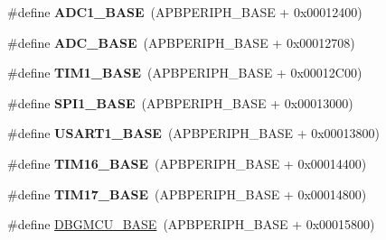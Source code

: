 \begin{DoxyCompactItemize}
\item 
\mbox{\label{group___peripheral__memory__map_ga695c9a2f892363a1c942405c8d351b91}} 
\#define {\bfseries A\+D\+C1\+\_\+\+B\+A\+SE}~(A\+P\+B\+P\+E\+R\+I\+P\+H\+\_\+\+B\+A\+SE + 0x00012400)
\item 
\mbox{\label{group___peripheral__memory__map_gad06cb9e5985bd216a376f26f22303cd6}} 
\#define {\bfseries A\+D\+C\+\_\+\+B\+A\+SE}~(A\+P\+B\+P\+E\+R\+I\+P\+H\+\_\+\+B\+A\+SE + 0x00012708)
\item 
\mbox{\label{group___peripheral__memory__map_gaf8aa324ca5011b8173ab16585ed7324a}} 
\#define {\bfseries T\+I\+M1\+\_\+\+B\+A\+SE}~(A\+P\+B\+P\+E\+R\+I\+P\+H\+\_\+\+B\+A\+SE + 0x00012\+C00)
\item 
\mbox{\label{group___peripheral__memory__map_ga50cd8b47929f18b05efbd0f41253bf8d}} 
\#define {\bfseries S\+P\+I1\+\_\+\+B\+A\+SE}~(A\+P\+B\+P\+E\+R\+I\+P\+H\+\_\+\+B\+A\+SE + 0x00013000)
\item 
\mbox{\label{group___peripheral__memory__map_ga86162ab3f740db9026c1320d46938b4d}} 
\#define {\bfseries U\+S\+A\+R\+T1\+\_\+\+B\+A\+SE}~(A\+P\+B\+P\+E\+R\+I\+P\+H\+\_\+\+B\+A\+SE + 0x00013800)
\item 
\mbox{\label{group___peripheral__memory__map_ga16c97093a531d763b0794c3e6d09e1bf}} 
\#define {\bfseries T\+I\+M16\+\_\+\+B\+A\+SE}~(A\+P\+B\+P\+E\+R\+I\+P\+H\+\_\+\+B\+A\+SE + 0x00014400)
\item 
\mbox{\label{group___peripheral__memory__map_gaffbedbe30e8c4cffdea326d6c1800574}} 
\#define {\bfseries T\+I\+M17\+\_\+\+B\+A\+SE}~(A\+P\+B\+P\+E\+R\+I\+P\+H\+\_\+\+B\+A\+SE + 0x00014800)
\item 
\#define \hyperlink{group___peripheral__memory__map_ga4adaf4fd82ccc3a538f1f27a70cdbbef}{D\+B\+G\+M\+C\+U\+\_\+\+B\+A\+SE}~(A\+P\+B\+P\+E\+R\+I\+P\+H\+\_\+\+B\+A\+SE + 0x00015800)
\item 
\mbox{\label{group___peripheral__memory__map_gab2d8a917a0e4ea99a22ac6ebf279bc72}} 

\end{DoxyCompactItemize}
